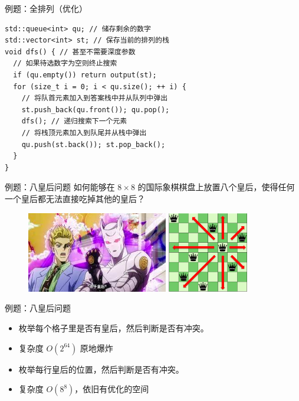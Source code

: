\documentclass[12pt,aspectratio=169]{beamer}
\begin{document}
\begin{frame}[fragile]{例题：全排列（优化）}
  \begin{verbatim}
std::queue<int> qu; // 储存剩余的数字
std::vector<int> st; // 保存当前的排列的栈
void dfs() { // 甚至不需要深度参数
  // 如果待选数字为空则终止搜索
  if (qu.empty()) return output(st);
  for (size_t i = 0; i < qu.size(); ++ i) {
    // 将队首元素加入到答案栈中并从队列中弹出
    st.push_back(qu.front()); qu.pop();
    dfs(); // 递归搜索下一个元素
    // 将栈顶元素加入到队尾并从栈中弹出
    qu.push(st.back()); st.pop_back();
  }
}
  \end{verbatim}
\end{frame}

\begin{frame}[fragile]{例题：八皇后问题}
  如何能够在 $8 \times 8$ 的国际象棋棋盘上放置八个皇后，使得任何一个皇后都无法直接吃掉其他的皇后？

  \begin{figure}
    \includegraphics[height=100pt]{killer_queen.jpeg}
    \includegraphics[height=100pt]{queen.png}
  \end{figure}
\end{frame}

\begin{frame}[fragile]{例题：八皇后问题}
  \begin{itemize}
    \item 枚举每个格子里是否有皇后，然后判断是否有冲突。\pause
    \item 复杂度 $O(2^{64})$ 原地爆炸\pause
    \item 枚举每行皇后的位置，然后判断是否有冲突。\pause
    \item 复杂度 $O(8^8)$，依旧有优化的空间
  \end{itemize}
\end{frame}
\end{document}
